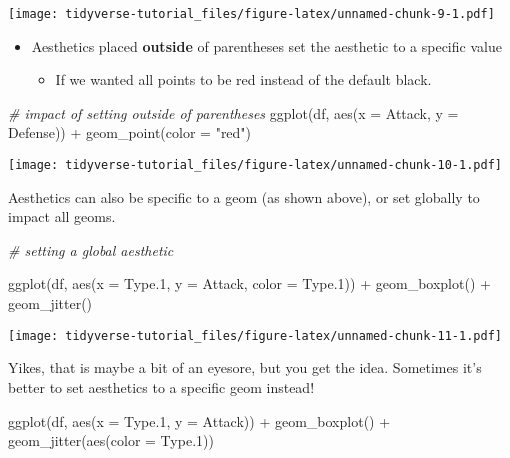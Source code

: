 \documentclass[
]{article}
\newenvironment{Shaded}{\begin{snugshade}}{\end{snugshade}}
\newcommand{\AttributeTok}[1]{\textcolor[rgb]{0.77,0.63,0.00}{#1}}
\newcommand{\CommentTok}[1]{\textcolor[rgb]{0.56,0.35,0.01}{\textit{#1}}}
\newcommand{\FloatTok}[1]{\textcolor[rgb]{0.00,0.00,0.81}{#1}}
\newcommand{\FunctionTok}[1]{\textcolor[rgb]{0.00,0.00,0.00}{#1}}
\newcommand{\NormalTok}[1]{#1}
\newcommand{\SpecialCharTok}[1]{\textcolor[rgb]{0.00,0.00,0.00}{#1}}
\newcommand{\StringTok}[1]{\textcolor[rgb]{0.31,0.60,0.02}{#1}}
\providecommand{\tightlist}{%
  \setlength{\itemsep}{0pt}\setlength{\parskip}{0pt}}
\begin{document}
\texttt{[image: tidyverse-tutorial\_files/figure-latex/unnamed-chunk-9-1.pdf]}

\begin{itemize}
\item
  Aesthetics placed \textbf{outside} of parentheses set the aesthetic to
  a specific value

  \begin{itemize}
  \tightlist
  \item
    If we wanted all points to be red instead of the default black.
  \end{itemize}
\end{itemize}

\begin{Shaded}
\begin{Highlighting}[]
\CommentTok{\# impact of setting outside of parentheses}
\FunctionTok{ggplot}\NormalTok{(df, }\FunctionTok{aes}\NormalTok{(}\AttributeTok{x =}\NormalTok{ Attack, }\AttributeTok{y =}\NormalTok{ Defense)) }\SpecialCharTok{+}
  \FunctionTok{geom\_point}\NormalTok{(}\AttributeTok{color =} \StringTok{"red"}\NormalTok{)}
\end{Highlighting}
\end{Shaded}

\texttt{[image: tidyverse-tutorial\_files/figure-latex/unnamed-chunk-10-1.pdf]}

Aesthetics can also be specific to a geom (as shown above), or set
globally to impact all geoms.

\begin{Shaded}
\begin{Highlighting}[]
\CommentTok{\# setting a global aesthetic}

\FunctionTok{ggplot}\NormalTok{(df, }\FunctionTok{aes}\NormalTok{(}\AttributeTok{x =}\NormalTok{ Type}\FloatTok{.1}\NormalTok{, }\AttributeTok{y =}\NormalTok{ Attack, }\AttributeTok{color =}\NormalTok{ Type}\FloatTok{.1}\NormalTok{)) }\SpecialCharTok{+}
  \FunctionTok{geom\_boxplot}\NormalTok{() }\SpecialCharTok{+} 
  \FunctionTok{geom\_jitter}\NormalTok{()}
\end{Highlighting}
\end{Shaded}

\texttt{[image: tidyverse-tutorial\_files/figure-latex/unnamed-chunk-11-1.pdf]}

Yikes, that is maybe a bit of an eyesore, but you get the idea.
Sometimes it's better to set aesthetics to a specific geom instead!

\begin{Shaded}
\begin{Highlighting}[]
\FunctionTok{ggplot}\NormalTok{(df, }\FunctionTok{aes}\NormalTok{(}\AttributeTok{x =}\NormalTok{ Type}\FloatTok{.1}\NormalTok{, }\AttributeTok{y =}\NormalTok{ Attack)) }\SpecialCharTok{+}
  \FunctionTok{geom\_boxplot}\NormalTok{() }\SpecialCharTok{+} 
  \FunctionTok{geom\_jitter}\NormalTok{(}\FunctionTok{aes}\NormalTok{(}\AttributeTok{color =}\NormalTok{ Type}\FloatTok{.1}\NormalTok{))}
\end{Highlighting}
\end{Shaded}
\end{document}
